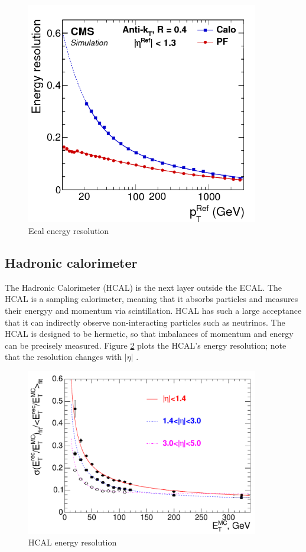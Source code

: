 \begin{figure}[h!]
\begin{centering}
\includegraphics[width=4in]{Chapter3/importfigs/Figure_013-a.png}
\par\end{centering}
\caption{Ecal energy resolution \cite{Bayatian:2006nff}\label{fig:ecalResL1}}
\end{figure}
 
 
\subsection{Hadronic calorimeter}

The Hadronic Calorimeter (HCAL) is the next layer outside the ECAL. The HCAL is a sampling calorimeter, meaning that it absorbs particles and measures their energyy and momentum via scintillation. HCAL has such a large acceptance that it can indirectly observe non-interacting particles such as neutrinos. The HCAL is designed to be hermetic, so that imbalances of momentum and energy can be precisely measured. Figure \ref{fig:hcalRes} plots the HCAL's energy resolution; note that the resolution changes with $|\eta|$ \cite{Bayatian:2006nff}.

\begin{figure}[h!]
\begin{centering}
\includegraphics[width=4in]{Chapter3/importfigs/Figure_001-008.pdf}
\par\end{centering}
\caption{HCAL energy resolution \cite{Bayatian:2006nff}\label{fig:hcalRes}}
\end{figure}

